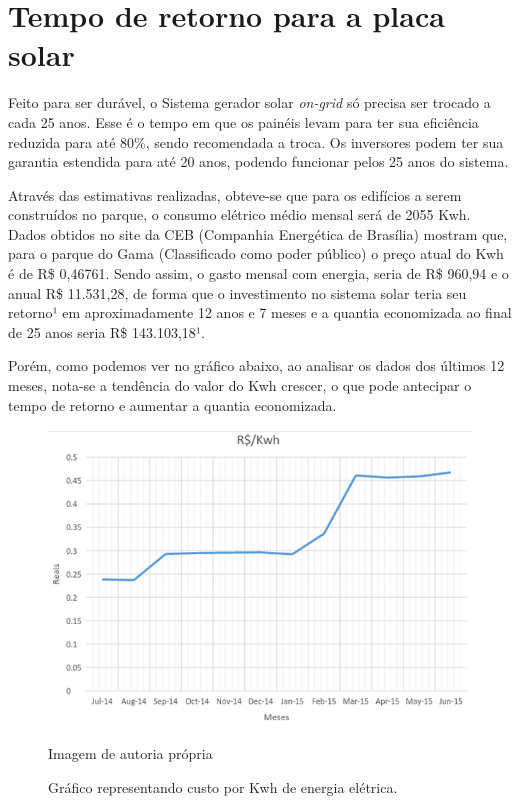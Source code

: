 \section{Tempo de retorno para a placa solar}

Feito para ser durável, o Sistema gerador solar \textit{on-grid} só precisa ser trocado a cada 25 anos. Esse é o tempo em que os painéis levam para ter sua eficiência reduzida para até 80\%, sendo recomendada a troca. Os inversores podem ter sua garantia estendida para até 20 anos, podendo funcionar pelos 25 anos do sistema.

Através das estimativas realizadas, obteve-se que para os edifícios a serem construídos no parque, o consumo elétrico médio mensal será de 2055 Kwh. Dados obtidos no site da CEB (Companhia Energética de Brasília) mostram que, para o parque do Gama (Classificado como poder público) o preço atual do Kwh é de R\$ 0,46761. Sendo assim, o gasto mensal com energia, seria de R\$ 960,94 e o anual R\$ 11.531,28, de forma que o investimento no sistema solar teria seu retorno¹ em aproximadamente 12 anos e 7 meses e a quantia economizada ao final de 25 anos seria R\$ 143.103,18¹.

Porém, como podemos ver no gráfico abaixo, ao analisar os dados dos últimos 12 meses, nota-se a tendência do valor do Kwh crescer, o que pode antecipar o tempo de retorno e aumentar a quantia economizada. 

\begin{figure}[H]
	\centering
	\label{Gráfico representando custo por Kwh de energia elétrica.}
		\includegraphics[keepaspectratio=true,scale=0.9]{solar/4.png}
	\caption{Gráfico representando custo por Kwh de energia elétrica.}
	\small{Imagem de autoria própria}
\end{figure}

